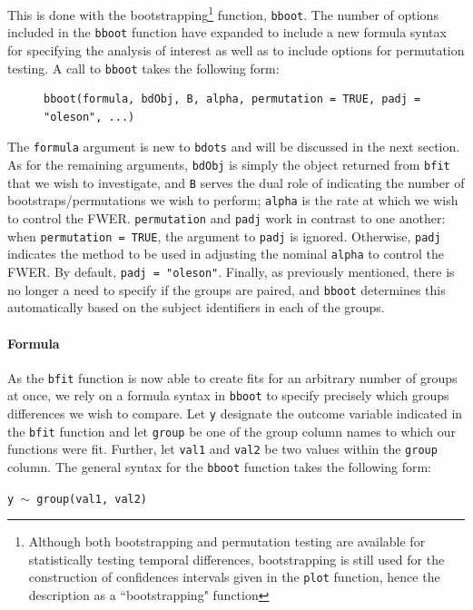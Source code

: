 \documentclass{article}
\newcommand{\xt}{\texttt}%
\begin{document}
This is done with the bootstrapping\footnote{Although both bootstrapping and permutation testing are available for statistically testing temporal differences, bootstrapping is still used for the construction of confidences intervals given in the \xt{plot} function, hence the description as a ``bootstrapping" function} function, \xt{bboot}. The number of options included in the \xt{bboot} function have expanded to include a new formula syntax for specifying the analysis of interest as well as to include options for permutation testing. A call to \xt{bboot} takes the following form:

\begin{singlespace}
\begin{figure}[H]
\centering
\begin{BVerbatim}
bboot(formula, bdObj, B, alpha, permutation = TRUE, padj = "oleson", ...)
\end{BVerbatim}

\end{figure}
\end{singlespace}
The \xt{formula} argument is new to  \xt{bdots} and will be discussed in the next section. As for the remaining arguments, \xt{bdObj} is simply the object returned from \xt{bfit} that we wish to investigate, and \xt{B} serves the dual role of indicating the number of bootstraps/permutations we wish to perform; \xt{alpha} is the rate at which we wish to control the FWER. \xt{permutation} and \xt{padj} work in contrast to one another: when \xt{permutation = TRUE}, the argument to \xt{padj} is ignored. Otherwise, \xt{padj} indicates the method to be used in adjusting the nominal \xt{alpha} to control the FWER. By default, \xt{padj = "oleson"}. Finally, as previously mentioned, there is no longer a need to specify if the groups are paired, and \xt{bboot} determines this automatically based on the subject identifiers in each of the groups.


\paragraph{Formula} \label{sec:formula}

As the \xt{bfit} function is now able to create fits for an arbitrary number of groups at once, we rely on a formula syntax in \xt{bboot} to specify precisely which groups differences we wish to compare. Let \xt{y} designate the outcome variable indicated in the \xt{bfit} function and let \xt{group} be one of the group column names to which our functions were fit. Further, let \xt{val1} and \xt{val2} be two values within the \xt{group} column. The general syntax for the \xt{bboot} function takes the following form:
\begin{center}
\tt y $\sim$ group(val1, val2)
\end{center}
\end{document}
